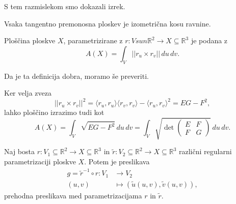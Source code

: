 S tem razmislekom smo dokazali izrek.

\begin{izrek}
\label{izr_tangentno_premonosna_ploskev_izometricna_kosu_ravnine}
  Vsaka tangentno premonosna ploskev je izometrična kosu ravnine.
\end{izrek}

\begin{definicija}
\label{def_ploscina_plosvke}
  Ploščina ploskve $X$, parametrizirane z $r: V sun \mathbb{R}^2 \to  X \subseteq  \mathbb{R}^3$ je podana z 
  \begin{equation*} A(X) = \int_{V} \lvert\lvert r_u \times  r_v \rvert\rvert   \, du \, dv.\end{equation*} 
\end{definicija}

\begin{opomba}
 Da je ta definicija dobra, moramo še preveriti.
\end{opomba}

\begin{opomba}
 Ker velja zveza
 \begin{equation*} \lvert\lvert r_u \times  r_v \rvert\rvert^2  = \langle r_u, r_u \rangle \langle r_v , r_v \rangle  - \langle r_u, r_v \rangle^2 = EG - F^2, \end{equation*}
lahko ploščino izrazimo tudi kot 
 \begin{equation*} A(X) = \int_{V} \sqrt{EG - F^2}  \, du \, dv = \int_{V} \sqrt{\det \begin{pmatrix}
 E & F \\
 F & G
 \end{pmatrix}}  \, du \, dv. \end{equation*}
\end{opomba}

\begin{definicija}
\label{def_prehodna_preslikava_med_parametrizacijama}
 Naj bosta $r: V_1 \subseteq  \mathbb{R}^2 \to  X \subseteq  \mathbb{R}^3$ in $\tilde{r}: V_2 \subseteq  \mathbb{R}^2 \to  X \subseteq  \mathbb{R}^3$ različni regularni parametrizaciji ploskve $X$.
 Potem je preslikava \begin{align*}
  g = \tilde{r}^{-1} \circ r: V_1 &\longrightarrow V_2 \\
  (u,v) &\longmapsto (\tilde{u}(u,v), \tilde{v}(u,v)),
 \end{align*}
 prehodna preslikava med parametrizacijama $r$ in $\tilde{r}$.
\end{definicija}

